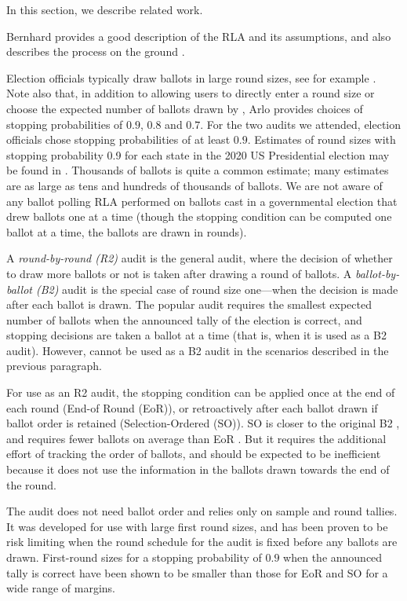 In this section, we describe related work. 

 Bernhard provides a good description of the RLA and its assumptions, and also describes the process on the ground \cite{bernhard-sok}. 

Election officials typically draw ballots in large round sizes, see for example \cite{va-2022,RI-report}. Note also that, in addition to allowing users to directly enter a round size or choose the expected number of ballots drawn by \BRAVO, Arlo provides choices of stopping probabilities of $0.9$, $0.8$ and $0.7$. For the two audits we attended, election officials chose stopping probabilities of at least $0.9$. Estimates of round sizes with stopping probability 0.9 for each state in the 2020 US Presidential election may be found in \cite{usenix_minerva}. Thousands of ballots is quite a common estimate; many estimates are as large as tens and hundreds of thousands of ballots. We are not aware of any ballot polling RLA performed on ballots cast in a governmental election that drew ballots one at a time (though the stopping condition can be computed one ballot at a time, the ballots are drawn in rounds). 

 A {\em round-by-round (R2)} audit is the general audit, where the decision of whether to draw more ballots or not is taken after drawing a round of ballots. A {\em ballot-by-ballot (B2)} audit is the special case of round size one---when the decision is made after each ballot is drawn. The popular \BRAVO audit requires the smallest expected number of ballots when the announced tally of the election is correct, and stopping decisions are taken a ballot at a time (that is, when it is used as a B2 audit). However, \BRAVO cannot be used as a B2 audit in the scenarios described in the previous paragraph. 

For use as an R2 audit, the \BRAVO stopping condition can be applied once at the end of each round (End-of Round (EoR)), or retroactively after each ballot drawn if ballot order is retained (Selection-Ordered (SO)). SO \BRAVO is closer to the original B2 \BRAVO, and requires fewer ballots on average than EoR \BRAVO. But it requires the additional effort of tracking the order of ballots, and should be expected to be inefficient because it does not use the information in the ballots drawn towards the end of the round. 

 The \Minerva audit \cite{usenix_minerva,arxiv_athena} does not need ballot order and relies only on sample and round tallies. It was developed for use with large first round sizes, and has been proven to be risk limiting when the round schedule for the audit is fixed before any ballots are drawn. First-round sizes for a stopping probability of $0.9$ when the announced tally is correct have been shown to be smaller than those for EoR and SO \BRAVO for a wide range of margins. 

